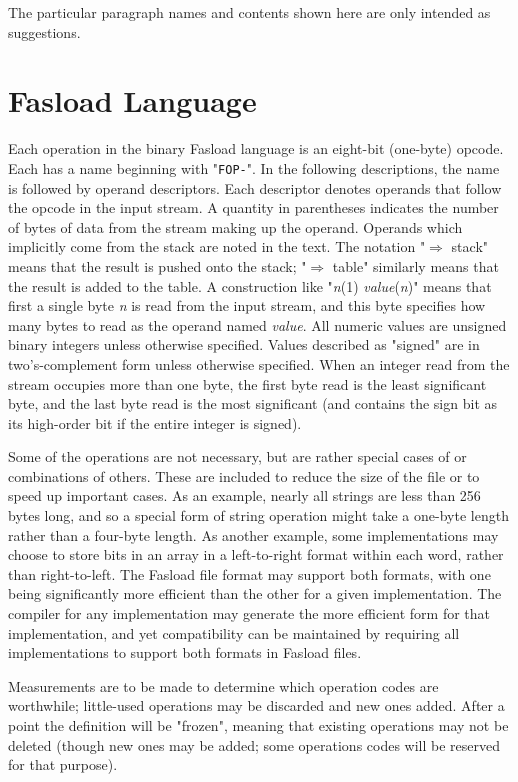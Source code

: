 The particular paragraph names and contents shown here are only intended as
suggestions.

\section{Fasload Language}

Each operation in the binary Fasload language is an eight-bit
(one-byte) opcode.  Each has a name beginning with "{\tt FOP-}".  In	
the following descriptions, the name is followed by operand
descriptors.  Each descriptor denotes operands that follow the opcode
in the input stream.  A quantity in parentheses indicates the number
of bytes of data from the stream making up the operand.  Operands
which implicitly come from the stack are noted in the text.  The
notation "$\Rightarrow$ stack" means that the result is pushed onto the
stack; "$\Rightarrow$ table" similarly means that the result is added to the
table.  A construction like "{\it n}(1) {\it value}({\it n})" means that
first a single byte {\it n} is read from the input stream, and this
byte specifies how many bytes to read as the operand named {\it value}.
All numeric values are unsigned binary integers unless otherwise
specified.  Values described as "signed" are in two's-complement form
unless otherwise specified.  When an integer read from the stream
occupies more than one byte, the first byte read is the least
significant byte, and the last byte read is the most significant (and
contains the sign bit as its high-order bit if the entire integer is
signed).

Some of the operations are not necessary, but are rather special
cases of or combinations of others.  These are included to reduce the
size of the file or to speed up important cases.  As an example,
nearly all strings are less than 256 bytes long, and so a special
form of string operation might take a one-byte length rather than a
four-byte length.  As another example, some implementations may
choose to store bits in an array in a left-to-right format within
each word, rather than right-to-left.  The Fasload file format may
support both formats, with one being significantly more efficient
than the other for a given implementation.  The compiler for any
implementation may generate the more efficient form for that
implementation, and yet compatibility can be maintained by requiring
all implementations to support both formats in Fasload files.

Measurements are to be made to determine which operation codes are
worthwhile; little-used operations may be discarded and new ones
added.  After a point the definition will be "frozen", meaning that
existing operations may not be deleted (though new ones may be added;
some operations codes will be reserved for that purpose).

